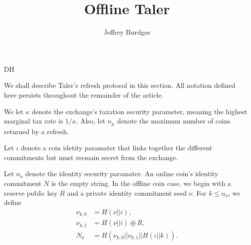 \documentclass{llncs}
\title{Offline Taler}
\def\mathcomma{,}
\def\mathperiod{.}
\begin{document}
\mainmatter

\author{Jeffrey Burdges}


\maketitle







\def\Nu{N}
\def\newmathrm#1{\expandafter\newcommand\csname #1\endcsname{\mathrm{#1}}}
\newmathrm{FDH}


We shall describe Taler's refresh protocol in this section.
All notation defined here persists throughout the remainder of
 the article.

We let $\kappa$ denote the exchange's taxation security parameter,
meaning the highest marginal tax rate is $1/\kappa$.  Also, let 
$n_\mu$ denote the maximum number of coins returned by a refresh.

\smallskip

Let $\iota$ denote a coin idetity paramater that
 links together the different commitments but must reemain secret
 from the exchange. 

Let $n_\nu$ denote the identity security paramater.
An online coin's identity commitment $\Nu$ is the empty string.
In the offline coin case, we begin with a reserve public key $R$
and a private identity commitment seed $\nu$.  
For $k \le n_\nu$,  we define 
\[ \begin{aligned}
\nu_{k,0} &= H(\nu || i) \mathcomma \\
\nu_{k,1} &= H(\nu || i) \oplus R \mathcomma \\
\Nu_k &= H(\nu_{k,0} || \nu_{k,1} || H(\iota || k) ) \mathperiod \\
\end{aligned} \]

\smallskip
\end{document}
